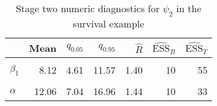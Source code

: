 \begin{table}

\caption{\label{tab:surv-stage-two-diag-psi-2}Stage two numeric diagnostics for $\psi_{2}$ in the survival example}
\centering
\begin{tabular}[t]{lrrrrrr}
\toprule
  & Mean & $q_{0.05}$ & $q_{0.95}$ & $\widehat{R}$ & $\widehat{\text{ESS}}_{B}$ & $\widehat{\text{ESS}}_{T}$\\
\midrule
\cellcolor{gray!6}{$\beta_{0}$} & \cellcolor{gray!6}{10.96} & \cellcolor{gray!6}{6.25} & \cellcolor{gray!6}{15.25} & \cellcolor{gray!6}{1.52} & \cellcolor{gray!6}{9} & \cellcolor{gray!6}{26}\\
$\beta_{1}$ & 8.12 & 4.61 & 11.57 & 1.40 & 10 & 55\\
\cellcolor{gray!6}{$\gamma$} & \cellcolor{gray!6}{7.53} & \cellcolor{gray!6}{6.06} & \cellcolor{gray!6}{9.21} & \cellcolor{gray!6}{1.41} & \cellcolor{gray!6}{10} & \cellcolor{gray!6}{44}\\
$\alpha$ & 12.06 & 7.04 & 16.96 & 1.44 & 10 & 33\\
\bottomrule
\end{tabular}
\end{table}